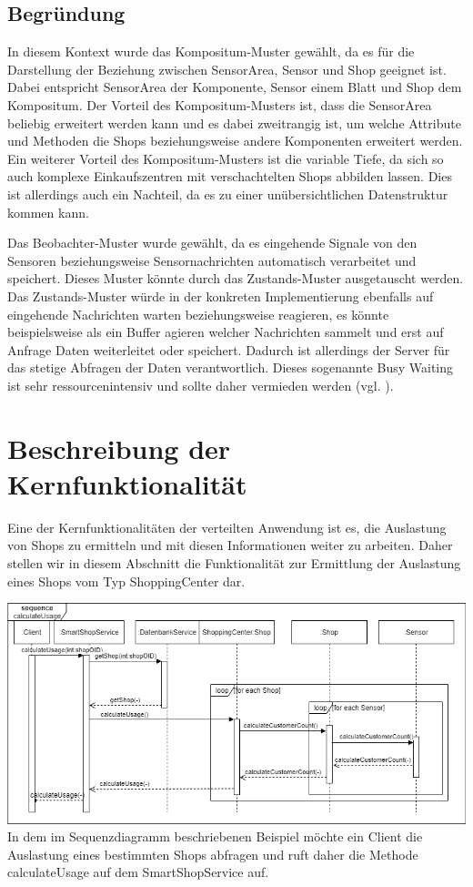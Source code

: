 \documentclass[runningheads]{llncs}
\begin{document}
\subsection{Begründung}
In diesem Kontext wurde das Kompositum-Muster gewählt, da es für die Darstellung der Beziehung zwischen SensorArea, Sensor und Shop geeignet ist.
Dabei entspricht SensorArea der Komponente, Sensor einem Blatt und Shop dem Kompositum.
Der Vorteil des Kompositum-Musters ist, dass die SensorArea beliebig erweitert werden kann und es dabei zweitrangig ist, um welche Attribute und Methoden die Shops beziehungsweise andere Komponenten erweitert werden. 
Ein weiterer Vorteil des Kompositum-Musters ist die variable Tiefe, da sich so auch komplexe Einkaufszentren mit verschachtelten Shops abbilden lassen.
Dies ist allerdings auch ein Nachteil, da es zu einer unübersichtlichen Datenstruktur kommen kann.

Das Beobachter-Muster wurde gewählt, da es eingehende Signale von den Sensoren beziehungsweise Sensornachrichten automatisch verarbeitet und speichert.
Dieses Muster könnte durch das Zustands-Muster ausgetauscht werden.
Das Zustands-Muster würde in der konkreten Implementierung ebenfalls auf eingehende Nachrichten warten beziehungsweise reagieren, es könnte beispielsweise als ein Buffer agieren welcher Nachrichten sammelt und erst auf Anfrage Daten weiterleitet oder speichert.
Dadurch ist allerdings der Server für das stetige Abfragen der Daten verantwortlich.
Dieses sogenannte Busy Waiting ist sehr ressourcenintensiv und sollte daher vermieden werden (vgl. \cite{RJ2021}).

\newpage
\section{Beschreibung der Kernfunktionalität}
Eine der Kernfunktionalitäten der verteilten Anwendung ist es, die Auslastung von Shops zu ermitteln und mit diesen Informationen weiter zu arbeiten.
Daher stellen wir in diesem Abschnitt die Funktionalität zur Ermittlung der Auslastung eines Shops vom Typ ShoppingCenter dar.

\includegraphics[width=\linewidth]{images/Sequenzdiagramm}
In dem im Sequenzdiagramm beschriebenen Beispiel möchte ein Client die Auslastung eines bestimmten Shops abfragen und ruft daher die Methode calculateUsage auf dem SmartShopService auf.
\\
\end{document}
